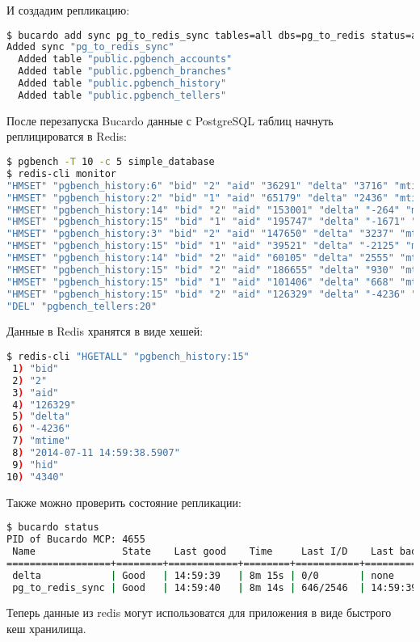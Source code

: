 И создадим репликацию:

\begin{lstlisting}[language=Bash,label=lst:bucardo-redis4,caption=Установка sync]
$ bucardo add sync pg_to_redis_sync tables=all dbs=pg_to_redis status=active
Added sync "pg_to_redis_sync"
  Added table "public.pgbench_accounts"
  Added table "public.pgbench_branches"
  Added table "public.pgbench_history"
  Added table "public.pgbench_tellers"
\end{lstlisting}

После перезапуска Bucardo данные с PostgreSQL таблиц начнуть реплицироватся в Redis:

\begin{lstlisting}[language=Bash,label=lst:bucardo-redis5,caption=Репликация в redis]
$ pgbench -T 10 -c 5 simple_database
$ redis-cli monitor
"HMSET" "pgbench_history:6" "bid" "2" "aid" "36291" "delta" "3716" "mtime" "2014-07-11 14:59:38.454824" "hid" "4331"
"HMSET" "pgbench_history:2" "bid" "1" "aid" "65179" "delta" "2436" "mtime" "2014-07-11 14:59:38.500896" "hid" "4332"
"HMSET" "pgbench_history:14" "bid" "2" "aid" "153001" "delta" "-264" "mtime" "2014-07-11 14:59:38.472706" "hid" "4333"
"HMSET" "pgbench_history:15" "bid" "1" "aid" "195747" "delta" "-1671" "mtime" "2014-07-11 14:59:38.509839" "hid" "4334"
"HMSET" "pgbench_history:3" "bid" "2" "aid" "147650" "delta" "3237" "mtime" "2014-07-11 14:59:38.489878" "hid" "4335"
"HMSET" "pgbench_history:15" "bid" "1" "aid" "39521" "delta" "-2125" "mtime" "2014-07-11 14:59:38.526317" "hid" "4336"
"HMSET" "pgbench_history:14" "bid" "2" "aid" "60105" "delta" "2555" "mtime" "2014-07-11 14:59:38.616935" "hid" "4337"
"HMSET" "pgbench_history:15" "bid" "2" "aid" "186655" "delta" "930" "mtime" "2014-07-11 14:59:38.541296" "hid" "4338"
"HMSET" "pgbench_history:15" "bid" "1" "aid" "101406" "delta" "668" "mtime" "2014-07-11 14:59:38.560971" "hid" "4339"
"HMSET" "pgbench_history:15" "bid" "2" "aid" "126329" "delta" "-4236" "mtime" "2014-07-11 14:59:38.5907" "hid" "4340"
"DEL" "pgbench_tellers:20"
\end{lstlisting}

Данные в Redis хранятся в виде хешей:

\begin{lstlisting}[language=Bash,label=lst:bucardo-redis6,caption=Данные в redis]
$ redis-cli "HGETALL" "pgbench_history:15"
 1) "bid"
 2) "2"
 3) "aid"
 4) "126329"
 5) "delta"
 6) "-4236"
 7) "mtime"
 8) "2014-07-11 14:59:38.5907"
 9) "hid"
10) "4340"
\end{lstlisting}

Также можно проверить состояние репликации:

\begin{lstlisting}[language=Bash,label=lst:bucardo-redis6,caption=Установка redis]
$ bucardo status
PID of Bucardo MCP: 4655
 Name               State    Last good    Time     Last I/D    Last bad    Time
==================+========+============+========+===========+===========+========
 delta            | Good   | 14:59:39   | 8m 15s | 0/0       | none      |
 pg_to_redis_sync | Good   | 14:59:40   | 8m 14s | 646/2546  | 14:59:39  | 8m 15s
\end{lstlisting}

Теперь данные из redis могут использоватся для приложения в виде быстрого кеш хранилища.
